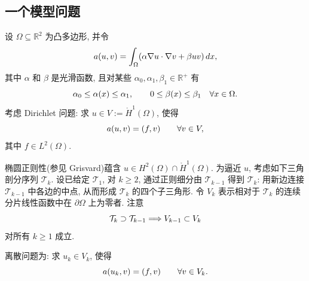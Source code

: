\subsection{一个模型问题}
\label{sec:ch06-model-problem}
\setcounter{thmcount}{0}
\setcounter{equation}{0}

设 $\Omega\subseteq\mathbb R^2$ 为凸多边形, 并令
\begin{equation}
\MathBookFormulaID{formula-ch06-model-bilinear-form}
\label{eq:ch06-model-bilinear-form}
a(u,v)=\int_\Omega(\alpha\nabla u\cdot\nabla v+\beta uv)\,dx,
\end{equation}
其中 $\alpha$ 和 $\beta$ 是光滑函数, 且对某些 $\alpha_0,\alpha_1,\beta_1\in\mathbb R^+$ 有
\[
\MathBookFormulaID{formula-ch06-coefficient-bounds}
\alpha_0\leq\alpha(x)\leq\alpha_1,
\qquad 0\leq\beta(x)\leq\beta_1
\quad\forall x\in\Omega.
\]
考虑 Dirichlet 问题: 求 $u\in V:=\mathring H^1(\Omega)$, 使得
\begin{equation}
\MathBookFormulaID{formula-ch06-model-dirichlet-problem}
\label{eq:ch06-model-dirichlet-problem}
a(u,v)=(f,v)\qquad\forall v\in V,
\end{equation}
其中 $f\in L^2(\Omega)$.

椭圆正则性(参见 Grisvard)蕴含 $u\in H^2(\Omega)\cap\mathring H^1(\Omega)$. 为逼近 $u$, 考虑如下三角剖分序列 $\mathcal T_k$. 设已给定 $\mathcal T_1$, 对 $k\geq2$, 通过正则细分由 $\mathcal T_{k-1}$ 得到 $\mathcal T_k$: 用新边连接 $\mathcal T_{k-1}$ 中各边的中点, 从而形成 $\mathcal T_k$ 的四个子三角形. 令 $V_k$ 表示相对于 $\mathcal T_k$ 的连续分片线性函数中在 $\partial\Omega$ 上为零者. 注意
\begin{equation}
\MathBookFormulaID{formula-ch06-nested-finite-element-spaces}
\label{eq:ch06-nested-finite-element-spaces}
\mathcal T_k\supset\mathcal T_{k-1}\Longrightarrow V_{k-1}\subset V_k
\end{equation}
对所有 $k\geq1$ 成立.

离散问题为: 求 $u_k\in V_k$, 使得
\begin{equation}
\MathBookFormulaID{formula-ch06-discrete-problem}
\label{eq:ch06-discrete-problem}
a(u_k,v)=(f,v)\qquad\forall v\in V_k.
\end{equation}

